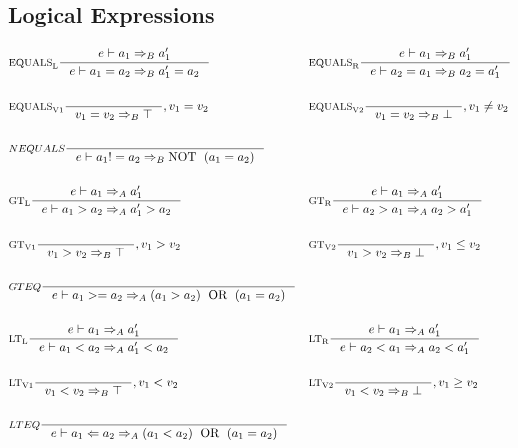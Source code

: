 \subsection{Logical Expressions}
\begin{align*}
&\inference[$\text{EQUALS}_\text{L}$]{e \vdash a_1 \Rightarrow_B a_1'}
                    {e \vdash a_1 = a_2 \Rightarrow_B a_1' = a_2}
&
&\inference[$\text{EQUALS}_\text{R}$]{e \vdash a_1 \Rightarrow_B a_1'}
                    {e \vdash a_2 = a_1 \Rightarrow_B a_2 = a_1'}
\\\\
&\inference[$\text{EQUALS}_\text{V1}$]{}
                    {v_1 = v_2 \Rightarrow_B \top}
										{, v_1 = v_2}
&
&\inference[$\text{EQUALS}_\text{V2}$]{}
                    {v_1 = v_2 \Rightarrow_B \bot}
										{, v_1 \neq v_2}
\\\\
&\inference[$NEQUALS$]{}
                    {e \vdash a_1 != a_2 \Rightarrow_B \Tnot (a_1 = a_2)}
\\\\
&\inference[$\text{GT}_\text{L}$]{e \vdash a_1 \Rightarrow_A a_1'}
                    {e \vdash a_1 > a_2 \Rightarrow_A a_1' > a_2}
&
&\inference[$\text{GT}_\text{R}$]{e \vdash a_1 \Rightarrow_A a_1'}
                    {e \vdash a_2 > a_1 \Rightarrow_A a_2 > a_1'}
\\\\
&\inference[$\text{GT}_\text{V1}$]{}
                    {v_1 > v_2 \Rightarrow_B \top}
										{, v_1 > v_2}
&
&\inference[$\text{GT}_\text{V2}$]{}
                    {v_1 > v_2 \Rightarrow_B \bot}
										{, v_1 \leq v_2}
\\\\
&\inference[$GTEQ$]{}
                    {e \vdash a_1 >= a_2 \Rightarrow_A (a_1 > a_2) \Tor (a_1 = a_2)}
\\\\
&\inference[$\text{LT}_\text{L}$]{e \vdash a_1 \Rightarrow_A a_1'}
                    {e \vdash a_1 < a_2 \Rightarrow_A a_1' < a_2}
&
&\inference[$\text{LT}_\text{R}$]{e \vdash a_1 \Rightarrow_A a_1'}
                    {e \vdash a_2 < a_1 \Rightarrow_A a_2 < a_1'}
\\\\
&\inference[$\text{LT}_\text{V1}$]{}
                    {v_1 < v_2 \Rightarrow_B \top}
										{, v_1 < v_2}
&
&\inference[$\text{LT}_\text{V2}$]{}
                    {v_1 < v_2 \Rightarrow_B \bot}
										{, v_1 \geq v_2}
\\\\
&\inference[$LTEQ$]{}
                    {e \vdash a_1 <= a_2 \Rightarrow_A (a_1 < a_2) \Tor (a_1 = a_2)}
\end{align*}
